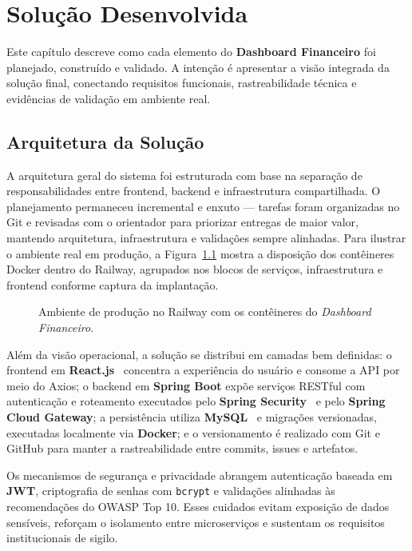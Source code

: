 \chapter{\label{chap:chap4}Solução Desenvolvida}

Este capítulo descreve como cada elemento do \textbf{Dashboard Financeiro} foi planejado, construído e validado. A intenção é apresentar a visão integrada da solução final, conectando requisitos funcionais, rastreabilidade técnica e evidências de validação em ambiente real.

\section{Arquitetura da Solução}

A arquitetura geral do sistema foi estruturada com base na separação de responsabilidades entre frontend, backend e infraestrutura compartilhada. O planejamento permaneceu incremental e enxuto — tarefas foram organizadas no Git e revisadas com o orientador para priorizar entregas de maior valor, mantendo arquitetura, infraestrutura e validações sempre alinhadas. Para ilustrar o ambiente real em produção, a Figura~\ref{fig:arquitetura-geral} mostra a disposição dos contêineres Docker dentro do Railway, agrupados nos blocos de serviços, infraestrutura e frontend conforme captura da implantação.

\begin{figure}[!htbp]
\centering
{}
\caption{Ambiente de produção no Railway com os contêineres do \textit{Dashboard Financeiro}.}
\label{fig:arquitetura-geral}
\end{figure}

Além da visão operacional, a solução se distribui em camadas bem definidas: o frontend em \textbf{React.js}~\cite{REACT2025} concentra a experiência do usuário e consome a API por meio do Axios; o backend em \textbf{Spring Boot} expõe serviços RESTful com autenticação e roteamento executados pelo \textbf{Spring Security}~\cite{SPRINGSECURITY2025} e pelo \textbf{Spring Cloud Gateway}; a persistência utiliza \textbf{MySQL}~\cite{MYSQL2025} e migrações versionadas, executadas localmente via \textbf{Docker}; e o versionamento é realizado com Git e GitHub para manter a rastreabilidade entre commits, issues e artefatos.

Os mecanismos de segurança e privacidade abrangem autenticação baseada em \textbf{JWT}, criptografia de senhas com \texttt{bcrypt} e validações alinhadas às recomendações do OWASP Top 10. Esses cuidados evitam exposição de dados sensíveis, reforçam o isolamento entre microserviços e sustentam os requisitos institucionais de sigilo.

